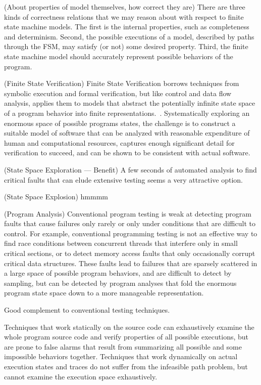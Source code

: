 (About properties of model themselves, how correct they are) There are three kinds of correctness relations that we may reason about with respect to finite state machine models. The first is the internal properties, such as completeness and determinism. Second, the possible executions of a model, described by paths through the FSM, may satisfy (or not) some desired property. Third, the finite state machine model should accurately represent possible behaviors of the program.~\cite{BookPezze2008}

(Finite State Verification) Finite State Verification borrows techniques from symbolic execution and formal verification, but like control and data flow analysis, applies them to models that abstract the potentially infinite state space of a program behavior into finite representations.~\cite{BookPezze2008}. Systematically exploring an enormous space of possible programs states, the challenge is to construct a suitable model of software that can be analyzed with reasonable expenditure of human and computational resources, captures enough significant detail for verification to succeed, and can be shown to be consistent with actual software.

(State Space Exploration --- Benefit) A few seconds of automated analysis to find critical faults that can elude extensive testing seems a very attractive option. 

(State Space Explosion) hmmmm 

(Program Analysis) Conventional program testing is weak at detecting program faults that cause failures only rarely or only under conditions that are difficult to control. For example, conventional programming testing is not an effective way to find race conditions between concurrent threads that interfere only in small critical sections, or to detect memory access faults that only occasionally corrupt critical data structures. These faults lead to failures that are sparsely scattered in a large space of possible program behaviors, and are difficult to detect by sampling, but can be detected by program analyses that fold the enormous program state space down to a more manageable representation.~\cite{BookPezze2008}

Good complement to conventional testing techniques.

Techniques that work statically on the source code can exhaustively examine the whole program source code and verify properties of all possible executions, but are prone to false alarms that result from summarizing all possible and some impossible behaviors together. Techniques that work dynamically on actual execution states and traces do not suffer from the infeasible path problem, but cannot examine the execution space exhaustively.~\cite{BookPezze2008}

